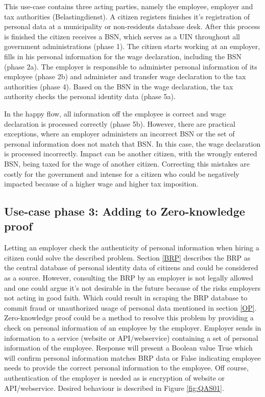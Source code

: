 This use-case contains three acting parties, namely the employee, employer and tax authorities (Belastingdienst).
A citizen registers finishes it's registration of personal data at a municipality or non-residents database desk. After this process is finished the citizen receives a BSN, which serves as a UIN throughout all government administrations (phase 1). The citizen starts working at an employer, fills in his personal information for the wage declaration, including the BSN (phase 2a). The employer is responsible to administer personal information of its employee (phase 2b) and administer and transfer wage declaration to the tax authorities (phase 4). Based on the BSN in the wage declaration, the tax authority checks the personal identity data (phase 5a). \par
In the happy flow, all information off the employee is correct and wage declaration is processed correctly (phase 5b). However, there are practical exceptions, where an employer administers an incorrect BSN or the set of personal information does not match that BSN. In this case, the wage declaration is processed incorrectly. Impact can be another citizen, with the wrongly entered BSN, being taxed for the wage of another citizen. Correcting this mistakes are costly for the government and intense for a citizen who could be negatively impacted because of a higher wage and higher tax imposition.

\subsection{Use-case phase 3: Adding to Zero-knowledge proof}
Letting an employer check the authenticity of personal information when hiring a citizen could solve the described problem. Section \ref{BRP} describes the BRP as the central database of personal identity data of citizens and could be considered as a source. However, consulting the BRP by an employer is not legally allowed and one could argue it's not desirable in the future because of the risks employers not acting in good faith. Which could result in scraping the BRP database to commit fraud or unauthorized usage of personal data mentioned in section \ref{OP}. Zero-knowledge proof could be a method to resolve this problem by providing a check on personal information of an employee by the employer. Employer sends in information to a service (website or API/webservice) containing a set of personal information of the employee. Response will present a Boolean value True which will confirm personal information matches BRP data or False indicating employee needs to provide the correct personal information to the employee. Off course, authentication of the employer is needed as is encryption of website or API/webservice. Desired behaviour is described in Figure \ref{fig:QAS01}.

